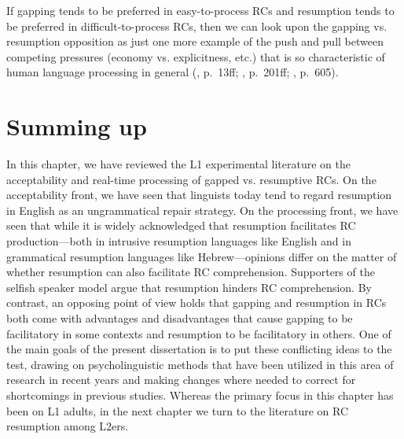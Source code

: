 If gapping tends to be preferred in easy-to-process RCs and resumption tends to be preferred in difficult-to-process RCs, then we can look upon the gapping vs. resumption opposition as just one more example of the push and pull between competing pressures (economy vs. explicitness, etc.) that is so characteristic of human language processing in general (\cite{hawkins2004}, p.~13ff; \cite{hawkins2014}, p.~201ff; \cite{casasanto.sag2008}, p.~605).

\section{Summing up}\label{res-conclusion}

In this chapter, we have reviewed the L1 experimental literature on the acceptability and real-time processing of gapped vs. resumptive RCs. On the acceptability front, we have seen that linguists today tend to regard resumption in English as an ungrammatical repair strategy. On the processing front, we have seen that while it is widely acknowledged that resumption facilitates RC production---both in intrusive resumption languages like English and in grammatical resumption languages like Hebrew---opinions differ on the matter of whether resumption can also facilitate RC comprehension. Supporters of the selfish speaker model argue that resumption hinders RC comprehension. By contrast, an opposing point of view holds that gapping and resumption in RCs both come with advantages and disadvantages that cause gapping to be facilitatory in some contexts and resumption to be facilitatory in others. One of the main goals of the present dissertation is to put these conflicting ideas to the test, drawing on psycholinguistic methods that have been utilized in this area of research in recent years and making changes where needed to correct for shortcomings in previous studies. Whereas the primary focus in this chapter has been on L1 adults, in the next chapter we turn to the literature on RC resumption among L2ers.